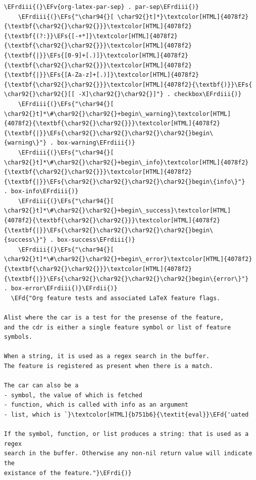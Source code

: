 \documentclass{scrartcl}
\newcommand{\EFd}[1]{\textcolor{EFd}{\textit{#1}}} %
\newcommand{\EFs}[1]{\textcolor{EFs}{#1}} %
\newcommand{\EFv}[1]{\textcolor{EFv}{#1}} %
\newcommand{\EFrdi}[1]{\textcolor{EFrdi}{#1}} %
\newcommand{\EFrdii}[1]{\textcolor{EFrdii}{#1}} %
\newcommand{\EFrdiii}[1]{\textcolor{EFrdiii}{#1}} %
\begin{document}
\begin{Code}
\begin{Verbatim}[]
    \EFrdiii{(}\EFv{org-latex-par-sep} . par-sep\EFrdiii{)}
    \EFrdiii{(}\EFs{"\char94{}[ \char92{}t]*}\textcolor[HTML]{4078f2}{\textbf{\char92{}\char92{}}}\textcolor[HTML]{4078f2}{\textbf{(?:}}\EFs{[-+*]}\textcolor[HTML]{4078f2}{\textbf{\char92{}\char92{}}}\textcolor[HTML]{4078f2}{\textbf{|}}\EFs{[0-9]+[.)]}\textcolor[HTML]{4078f2}{\textbf{\char92{}\char92{}}}\textcolor[HTML]{4078f2}{\textbf{|}}\EFs{[A-Za-z]+[.)]}\textcolor[HTML]{4078f2}{\textbf{\char92{}\char92{}}}\textcolor[HTML]{4078f2}{\textbf{)}}\EFs{ \char92{}\char92{}[[ -X]\char92{}\char92{}]"} . checkbox\EFrdiii{)}
    \EFrdiii{(}\EFs{"\char94{}[ \char92{}t]*\#\char92{}\char92{}+begin\_warning}\textcolor[HTML]{4078f2}{\textbf{\char92{}\char92{}}}\textcolor[HTML]{4078f2}{\textbf{|}}\EFs{\char92{}\char92{}\char92{}\char92{}begin\{warning\}"} . box-warning\EFrdiii{)}
    \EFrdiii{(}\EFs{"\char94{}[ \char92{}t]*\#\char92{}\char92{}+begin\_info}\textcolor[HTML]{4078f2}{\textbf{\char92{}\char92{}}}\textcolor[HTML]{4078f2}{\textbf{|}}\EFs{\char92{}\char92{}\char92{}\char92{}begin\{info\}"}       . box-info\EFrdiii{)}
    \EFrdiii{(}\EFs{"\char94{}[ \char92{}t]*\#\char92{}\char92{}+begin\_success}\textcolor[HTML]{4078f2}{\textbf{\char92{}\char92{}}}\textcolor[HTML]{4078f2}{\textbf{|}}\EFs{\char92{}\char92{}\char92{}\char92{}begin\{success\}"} . box-success\EFrdiii{)}
    \EFrdiii{(}\EFs{"\char94{}[ \char92{}t]*\#\char92{}\char92{}+begin\_error}\textcolor[HTML]{4078f2}{\textbf{\char92{}\char92{}}}\textcolor[HTML]{4078f2}{\textbf{|}}\EFs{\char92{}\char92{}\char92{}\char92{}begin\{error\}"}     . box-error\EFrdiii{)}\EFrdii{)}
  \EFd{"Org feature tests and associated LaTeX feature flags.

Alist where the car is a test for the presense of the feature,
and the cdr is either a single feature symbol or list of feature symbols.

When a string, it is used as a regex search in the buffer.
The feature is registered as present when there is a match.

The car can also be a
- symbol, the value of which is fetched
- function, which is called with info as an argument
- list, which is `}\textcolor[HTML]{b751b6}{\textit{eval}}\EFd{'uated

If the symbol, function, or list produces a string: that is used as a regex
search in the buffer. Otherwise any non-nil return value will indicate the
existance of the feature."}\EFrdi{)}
\end{Verbatim}
\end{Code}
\end{document}
